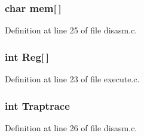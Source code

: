 \subsubsection[{mem}]{\setlength{\rightskip}{0pt plus 5cm}char mem[$\,$]}\label{system_8c_abba2b58d12066c22a7000e0882e8c5bb}


Definition at line 25 of file disasm.\+c.

\subsubsection[{Reg}]{\setlength{\rightskip}{0pt plus 5cm}int Reg[$\,$]}\label{system_8c_af59ba45e6711128385a007b7f094cb5f}


Definition at line 23 of file execute.\+c.

\subsubsection[{Traptrace}]{\setlength{\rightskip}{0pt plus 5cm}int Traptrace}\label{system_8c_a652034e5a9e2bb432b8f4c841d0834ab}


Definition at line 26 of file disasm.\+c.

